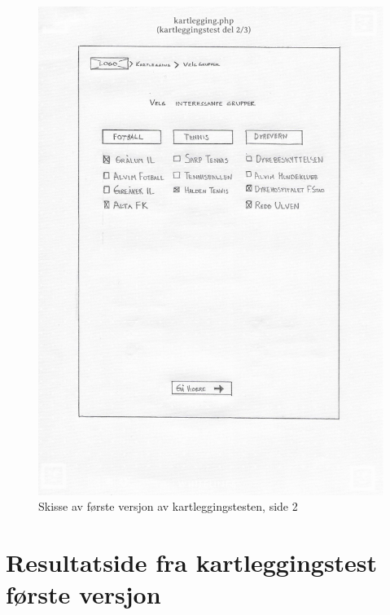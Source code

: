 \begin{figure}[H]
\centering
\includegraphics[width=.9\textwidth]{Illustrasjoner/Skisser-pdf/1.0/1-7-kartlegging-hjul-del2.pdf}
\caption{Skisse av første versjon av kartleggingstesten, side 2}
\label{vedlegg:1-7-kartlegging-hjul-2}
\end{figure}

\section{Resultatside fra kartleggingstest første versjon}


